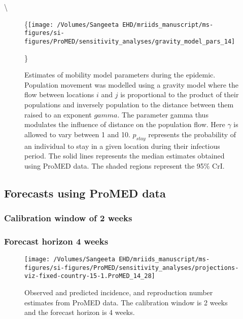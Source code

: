\documentclass[9pt,twoside,lineno]{pnas-new}
\begin{document}
\textbackslash \begin{figure}

  \{\centering \texttt{[image: /Volumes/Sangeeta EHD/mriids\_manuscript/ms-figures/si-figures/ProMED/sensitivity\_analyses/gravity\_model\_pars\_14]}

  \}

  \caption{Estimates of mobility model
  parameters during the epidemic. Population movement was modelled using a
  gravity model where the flow between locations \(i\) and \(j\) is
  proportional to the product of their populations and inversely
  population to the distance between them raised to an exponent \(gamma\).
  The parameter gamma thus modulates the influence of distance on the
  population flow. Here \(\gamma\) is allowed to vary between 1 and 10.
  \(p_{stay}\) represents the probability of an individual to stay in a
  given location during their infectious period. The solid lines
  represents the median estimates obtained using ProMED data. The shaded
  regions represent the 95\% CrI.}
\label{fig:SI-33}
\end{figure}

\hypertarget{forecasts-using-promed-data-1}{%
  \subsection{Forecasts using ProMED
    data}\label{forecasts-using-promed-data-1}}

\hypertarget{calibration-window-of-2-weeks-3}{%
  \subsubsection{Calibration window of 2
    weeks}\label{calibration-window-of-2-weeks-3}}

\hypertarget{forecast-horizon-4-weeks-8}{%
  \subsubsection{Forecast horizon 4 weeks}\label{forecast-horizon-4-weeks-8}}

\begin{figure}

  {\centering \texttt{[image: /Volumes/Sangeeta EHD/mriids\_manuscript/ms-figures/si-figures/ProMED/sensitivity\_analyses/projections-viz-fixed-country-15-1.ProMED\_14\_28]} 

  }

  \caption{Observed and predicted incidence, and reproduction number
    estimates from ProMED data. The calibration window is 2 weeks and the forecast horizon is 4 weeks.}\label{fig:SI-34}
\end{figure}
\end{document}
